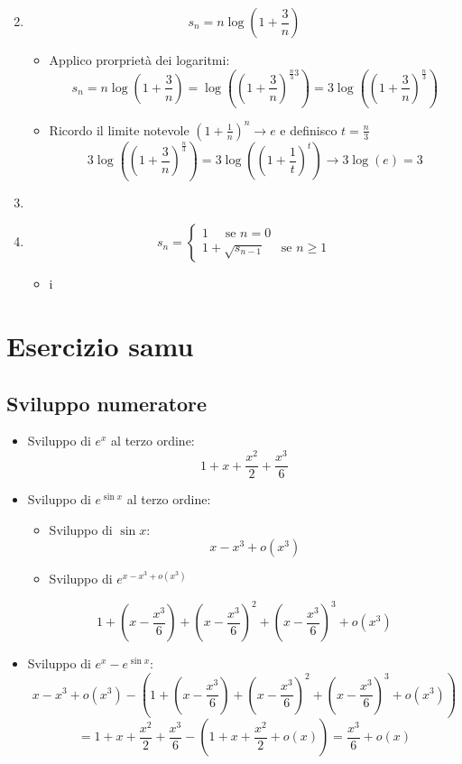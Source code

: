 \documentclass[12pt,a4paper,oneside]{article}
\begin{document}
\begin{enumerate}
\begin{itemize}
\[	\] 
	\end{itemize}
	\item \[
	s_n = n \log \left( 1 + \frac{3}{n} \right) 
	\] 
	\begin{itemize}
		\item Applico prorprietà dei logaritmi:
		\[
		s_n = n \log \left( 1 + \frac{3}{n} \right) = \log \left( \left( 1+\frac{3}{n} \right) ^{\frac{n}{3}3} \right) = 3\log\left( \left( 1+\frac{3}{n} \right) ^{\frac{n}{3}} \right) 
		\] 
		\item Ricordo il limite notevole $\left( 1+ \frac{1}{n} \right) ^{n} \to e$ e definisco $t=\frac{n}{3}$
		\[
		3\log\left( \left( 1+\frac{3}{n} \right) ^{\frac{n}{3}} \right) = 3\log\left( \left( 1+\frac{1}{t} \right) ^{t} \right) \to 3 \log \left( e \right) = 3
		\] 
	\end{itemize}
	\item 
	\item \[
	s_n =
	\begin{cases}
		1 \quad \text{ se } n=0\\
		1+ \sqrt{s_{n-1}}  \quad \text{ se } n \ge 1
	\end{cases}
	\] 
	\begin{itemize}
		\item 
		i
	\end{itemize}
\end{enumerate}
\section{Esercizio samu}
\subsection{Sviluppo numeratore}
\begin{itemize}
	\item Sviluppo di $ e^{x} $ al terzo ordine: 
		\[
		1 + x + \frac{x^2}{2} + \frac{x^3}{6}
		\] 
	\item Sviluppo di $ e^{\sin x} $ al terzo ordine: 
		\begin{itemize}
			\item Sviluppo di $ \sin x $: 
				\[
					x - x^3 + o\left( x^3 \right) 
				\] 
			\item Sviluppo di $ e^{x - x^3 + o\left( x^3 \right) } $			
		\end{itemize}
		\[
			 1 + \left( x-\frac{x^3}{6} \right) + \left( x-\frac{x^3}{6} \right) ^2 + \left( x-\frac{x^3}{6} \right) ^3 + o\left( x^3 \right) 
		\] 
	\item Sviluppo di $ e^{x}- e^{ \sin x} $: 
	\[
		x - x^3 + o\left( x^3 \right) - \left( 			1 + \left( x-\frac{x^3}{6} \right) + \left( x-\frac{x^3}{6} \right) ^2 + \left( x-\frac{x^3}{6} \right) ^3 + o\left( x^3 \right) 
 \right) 
	\] 
		\[
			=1 + x + \frac{x^2}{2} + \frac{x^3}{6} - (1+x +\frac{x^2}{2}+ o\left( x \right) ) = \frac{x^3}{6}+ o\left( x \right) 
		\] 
\end{itemize}
\end{document}
